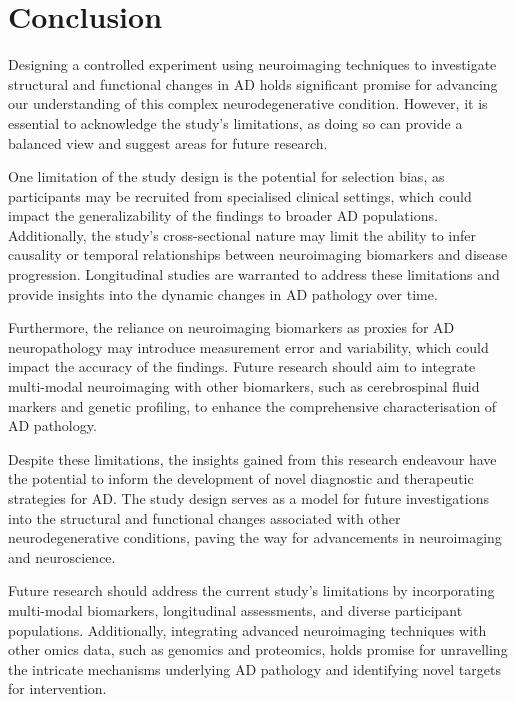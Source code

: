 \documentclass[10pt]{article}
\begin{document}
\begin{sloppypar}
  \section{Conclusion}
  \label{sec:conclusion}

  Designing a controlled experiment using neuroimaging techniques to investigate structural and functional changes in AD holds significant promise for advancing our understanding of this complex neurodegenerative condition. However, it is essential to acknowledge the study's limitations, as doing so can provide a balanced view and suggest areas for future research.

  One limitation of the study design is the potential for selection bias, as participants may be recruited from specialised clinical settings, which could impact the generalizability of the findings to broader AD populations. Additionally, the study's cross-sectional nature may limit the ability to infer causality or temporal relationships between neuroimaging biomarkers and disease progression. Longitudinal studies are warranted to address these limitations and provide insights into the dynamic changes in AD pathology over time.

  Furthermore, the reliance on neuroimaging biomarkers as proxies for AD neuropathology may introduce measurement error and variability, which could impact the accuracy of the findings. Future research should aim to integrate multi-modal neuroimaging with other biomarkers, such as cerebrospinal fluid markers and genetic profiling, to enhance the comprehensive characterisation of AD pathology.

  Despite these limitations, the insights gained from this research endeavour have the potential to inform the development of novel diagnostic and therapeutic strategies for AD. The study design serves as a model for future investigations into the structural and functional changes associated with other neurodegenerative conditions, paving the way for advancements in neuroimaging and neuroscience.

  Future research should address the current study's limitations by incorporating multi-modal biomarkers, longitudinal assessments, and diverse participant populations. Additionally, integrating advanced neuroimaging techniques with other omics data, such as genomics and proteomics, holds promise for unravelling the intricate mechanisms underlying AD pathology and identifying novel targets for intervention.

  \pagebreak
  \singlespacing %
  
  

\end{sloppypar}
\end{document}
